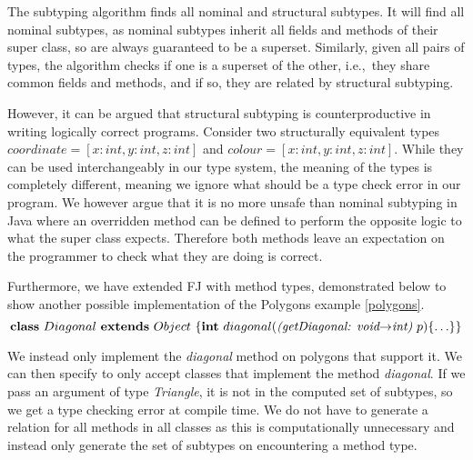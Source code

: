 \documentclass[runningheads]{llncs}
\begin{document}
The subtyping algorithm finds all nominal and structural subtypes.
It will find all nominal subtypes, as nominal subtypes inherit all fields and methods of their super class, so are always guaranteed to be a superset. 
Similarly, given all pairs of types, the algorithm checks if one is a superset of the other, i.e.,\ they share common fields and methods, and if so, they are related by structural subtyping. 

However, it can be argued that structural subtyping is counterproductive in writing logically correct programs.
Consider two structurally equivalent types $coordinate = [x:int, y:int, z:int]$ and $colour = [x:int, y:int, z:int]$. 
While they can be used interchangeably in our type system, the meaning of the types is completely different, meaning we ignore what should be a type check error in our program. 
We however argue that it is no more unsafe than nominal subtyping in Java where an overridden method can be defined to perform the opposite logic to what the super class expects. 
Therefore both methods leave an expectation on the programmer to check what they are doing is correct. 

Furthermore, we have extended FJ with method types, demonstrated below to show another possible implementation of the Polygons example \autoref{polygons}.
$$
\mathbf{class} \  Diagonal \ \mathbf{extends }\  Object\ \{
	\mathbf{int}\ diagonal(\textit{(getDiagonal: void$\rightarrow$int)}  \ p)\{\ldots\}
\}
$$

We instead only implement the \emph{diagonal} method on polygons that support it. We can then specify to only accept classes that implement the method \emph{diagonal}. If we pass an argument of type \emph{Triangle}, it is not in the computed set of subtypes, so we get a type checking error at compile time.
We do not have to generate a relation for all methods in all classes as this is computationally unnecessary and instead
only generate the set of subtypes on encountering a method type.

\end{document}
